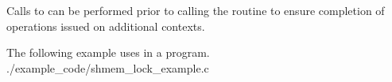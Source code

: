 \begin{apidefinition}
{    Calls to  can be performed prior to calling the
     routine to ensure completion of operations issued
    on additional contexts.
}

\begin{apiexamples}

\apicexample
    {The following example uses  in a \Cstd[11] program.}
    {./example_code/shmem_lock_example.c}
    {}

\end{apiexamples}

\end{apidefinition}

